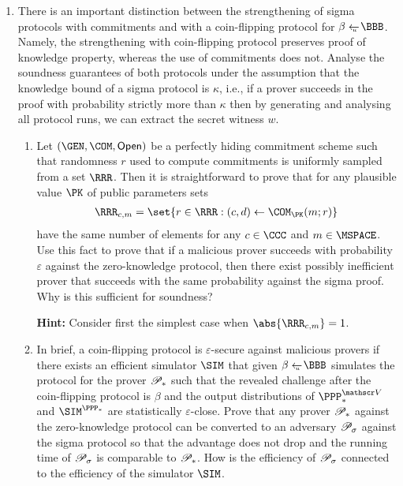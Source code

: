 \documentclass{article}
\begin{document}
\begin{enumerate}
  \item There is an important distinction between the strengthening of
    sigma protocols with commitments and with a coin-flipping protocol
    for $\beta\getsu\BBB$. Namely, the strengthening with
    coin-flipping protocol preserves proof of knowledge property,
    whereas the use of commitments does not. Analyse the soundness
    guarantees of both protocols under the assumption that the
    knowledge bound of a sigma protocol is $\kappa$, i.e., if a prover
    succeeds in the proof with probability strictly more than $\kappa$
    then by generating and analysing all protocol runs, we can extract
    the secret witness $w$.
    \begin{enumerate}
    \item Let $(\GEN,\COM,\OPEN)$ be a perfectly hiding commitment
      scheme such that randomness $r$ used to compute commitments is
      uniformly sampled from a set $\RRR$. Then it is straightforward
      to prove that for any plausible value $\PK$ of public parameters
      sets
      \begin{align*}
        \RRR_{c,m}=\set{r\in\RRR: (c,d)\gets\COM_\PK(m;r)}
      \end{align*}
      have the same number of elements for any $c\in\CCC$ and
      $m\in\MSPACE$. Use this fact to prove that if a malicious prover
      succeeds with probability $\varepsilon$ against the
      zero-knowledge protocol, then there exist possibly inefficient
      prover that succeeds with the same probability against the sigma
      proof. Why is this sufficient for soundness?

      \textbf{Hint:} Consider first the simplest case when
      $\abs{\RRR_{c,m}}=1$.
    \item In brief, a coin-flipping protocol is $\varepsilon$-secure
      against malicious provers if there exists an efficient simulator
      $\SIM$ that given $\beta\getsu\BBB$ simulates the protocol for
      the prover $\mathscr{P}_*$ such that the revealed challenge after
      the coin-flipping protocol is $\beta$ and the output
      distributions of $\PPP_*^{\VERIFIER}$ and $\SIM^{\PPP_*}$ are
      statistically $\varepsilon$-close. Prove that any prover
      $\mathscr{P}_*$ against the zero-knowledge protocol can be converted
      to an adversary $\mathscr{P}_\sigma$ against the sigma protocol so
      that the advantage does not drop and the running time of
      $\mathscr{P}_\sigma$ is comparable to $\mathscr{P}_*$. How is the
      efficiency of $\mathscr{P}_\sigma$ connected to the efficiency of
      the simulator $\SIM$.


\end{enumerate}
\end{enumerate}
\end{document}

